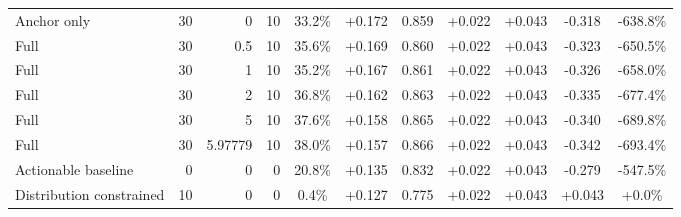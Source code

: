 \begin{table}[htbp]
\begin{tabular}{lrrrccccccc}
Anchor only & 30 & 0 & 10 & 33.2\% & +0.172 & 0.859 & +0.022 & +0.043 & -0.318 & -638.8\% \\
Full & 30 & 0.5 & 10 & 35.6\% & +0.169 & 0.860 & +0.022 & +0.043 & -0.323 & -650.5\% \\
Full & 30 & 1 & 10 & 35.2\% & +0.167 & 0.861 & +0.022 & +0.043 & -0.326 & -658.0\% \\
Full & 30 & 2 & 10 & 36.8\% & +0.162 & 0.863 & +0.022 & +0.043 & -0.335 & -677.4\% \\
Full & 30 & 5 & 10 & 37.6\% & +0.158 & 0.865 & +0.022 & +0.043 & -0.340 & -689.8\% \\
Full & 30 & 5.97779 & 10 & 38.0\% & +0.157 & 0.866 & +0.022 & +0.043 & -0.342 & -693.4\% \\
Actionable baseline & 0 & 0 & 0 & 20.8\% & +0.135 & 0.832 & +0.022 & +0.043 & -0.279 & -547.5\% \\
Distribution constrained & 10 & 0 & 0 & 0.4\% & +0.127 & 0.775 & +0.022 & +0.043 & +0.043 & +0.0\% \\
\bottomrule
\end{tabular}
\end{table}
